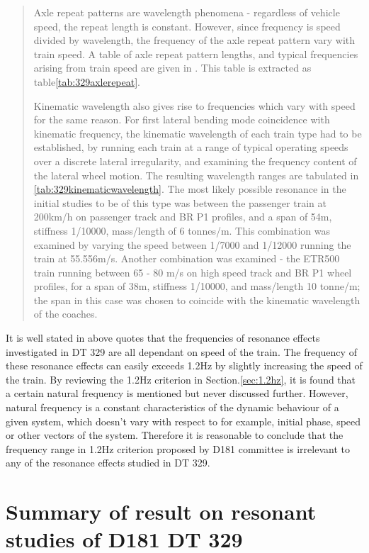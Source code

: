 \begin{quote}
Axle repeat patterns are wavelength phenomena - regardless of vehicle speed, the repeat length is constant. However, since frequency is speed divided by wavelength, the frequency of the axle repeat pattern vary with train speed. A table of axle repeat pattern lengths, and typical frequencies arising from train speed are given in \cite[Appendix C Table C1]{d181dt329}. This table is extracted as table\ref{tab:329axlerepeat}. 

Kinematic wavelength also gives rise to frequencies which vary with speed for the same reason. For first lateral bending mode coincidence with kinematic frequency, the kinematic wavelength of each train type had to be established, by running each train at a range of typical operating speeds over a discrete lateral irregularity, and examining the frequency content of the lateral wheel motion. The resulting wavelength ranges are tabulated in \ref{tab:329kinematicwavelength}. The most likely possible resonance in the initial studies to be of this type was between the passenger train at 200km/h on passenger track and BR P1 profiles, and a span of 54m, stiffness 1/10000, mass/length of 6 tonnes/m. This combination was examined by varying the speed between 1/7000 and 1/12000 running the train at 55.556m/s. Another combination was examined - the ETR500 train running between 65 - 80 m/s on high speed track and BR P1 wheel profiles, for a span of 38m, stiffness 1/10000, and mass/length 10 tonne/m; the span in this case was chosen to coincide with the kinematic wavelength of the coaches.
\end{quote}

It is well stated in above quotes that the frequencies of resonance effects investigated in DT 329 are all dependant on speed of the train. The frequency of these resonance effects can easily exceeds 1.2Hz by slightly increasing the speed of the train. By reviewing the 1.2Hz criterion in Section.\ref{sec:1.2hz}, it is found that a certain natural frequency is mentioned but never discussed further. However, natural frequency is a constant characteristics of the dynamic behaviour of a given system, which doesn't vary with respect to for example, initial phase, speed or other vectors of the system. Therefore it is reasonable to conclude that the frequency range in 1.2Hz criterion proposed by D181 committee is irrelevant to any of the resonance effects studied in DT 329. 



\section{Summary of result on resonant studies of D181 DT 329}


